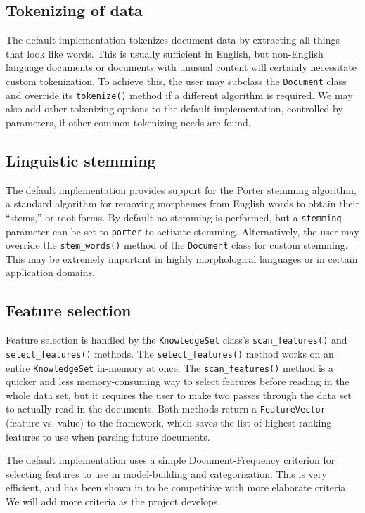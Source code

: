 \documentclass[a4paper,twocolumn]{article}
\begin{document}
\subsection{Tokenizing of data}
The default implementation tokenizes document data by extracting all things that look like words.  This is usually sufficient in English, but non-English language documents or documents with unusual content will certainly necessitate custom tokenization.  To achieve this, the user may subclass the \texttt{Document} class and override its \texttt{tokenize()} method if a different algorithm is required.  We may also add other tokenizing options to the default implementation, controlled by parameters, if other common tokenizing needs are found.

\subsection{Linguistic stemming}
The default implementation provides support for the Porter stemming algorithm, a standard algorithm for removing morphemes from English words to obtain their ``stems,'' or root forms.  By default no stemming is performed, but a \texttt{stemming} parameter can be set to \texttt{porter} to activate stemming.  Alternatively, the user may override the \texttt{stem\_words()} method of the \texttt{Document} class for custom stemming.  This may be extremely important in highly morphological languages or in certain application domains.

\subsection{Feature selection}
Feature selection is handled by the \texttt{KnowledgeSet} class's \texttt{scan\_features()} and \texttt{select\_features()} methods.  The \texttt{select\_features()} method works on an entire \texttt{KnowledgeSet} in-memory at once.  The \texttt{scan\_features()} method is a quicker and less memory-consuming way to select features before reading in the whole data set, but it requires the user to make two passes through the data set to actually read in the documents.  Both methods return a \texttt{FeatureVector} (feature vs. value) to the framework, which saves the list of highest-ranking features to use when parsing future documents.

The default implementation uses a simple Document-Frequency criterion for selecting features to use in model-building and categorization.  This is very efficient, and has been shown in \cite{yang:97} to be competitive with more elaborate criteria.  We will add more criteria as the project develops.
\end{document}
